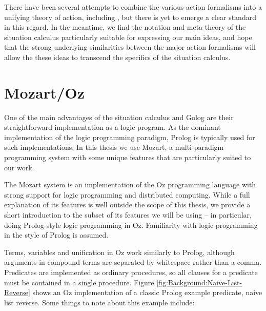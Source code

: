 There have been several attempts to combine the various action formalisms
into a unifying theory of action, including \citep{belleghem95combine_sitcalc_evtcalc,kowalski97reconcile_sitcalc_evtcalc,thielscher06reconcile_sc_fc,thielscher07unifying_action_calculus},
but there is yet to emerge a clear standard in this regard. In the
meantime, we find the notation and meta-theory of the situation calculus
particularly suitable for expressing our main ideas, and hope that
the strong underlying similarities between the major action formalisms
will allow the these ideas to transcend the specifics of the situation
calculus.


\section{Mozart/Oz\label{sec:Background:Mozart/Oz}}

One of the main advantages of the situation calculus and Golog are
their straightforward implementation as a logic program. As the dominant
implementation of the logic programming paradigm, Prolog is typically
used for such implementations. In this thesis we use Mozart, a multi-paradigm
programming system with some unique features that are particularly
suited to our work.

The Mozart system \citep{vanroy99mozart} is an implementation of
the Oz programming language \citep{vanRoyHaridi04ctm} with strong
support for logic programming and distributed computing. While a full
explanation of its features is well outside the scope of this thesis,
we provide a short introduction to the subset of its features we will
be using -- in particular, doing Prolog-style logic programming in
Oz. Familiarity with logic programming in the style of Prolog is assumed.

Terms, variables and unification in Oz work similarly to Prolog, although
arguments in compound terms are separated by whitespace rather than
a comma. Predicates are implemented as ordinary procedures, so all
clauses for a predicate must be contained in a single procedure. Figure
\ref{fig:Background:Naive-List-Reverse} shows an Oz implementation
of a classic Prolog example predicate, naive list reverse. Some things
to note about this example include:

